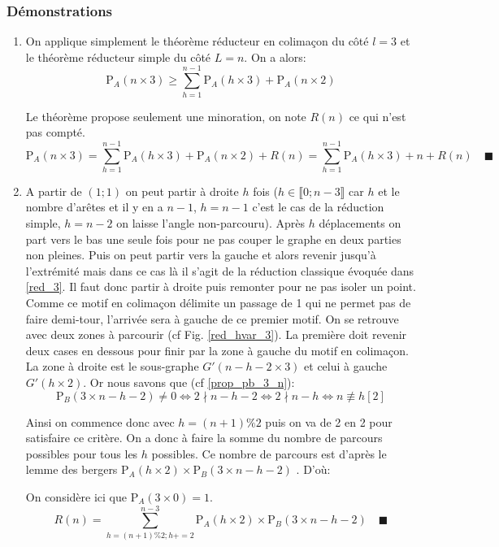 \documentclass[twoside, a4paper, 12pt]{report}
\newcommand{\cqfd}[1][\quad]{\ensuremath{#1\blacksquare}}
\newcommand{\pa}[2]{\ensuremath{\text{P}_A\left(#1 \times #2\right)}}
\newcommand{\pb}[2]{\ensuremath{\text{P}_B\left(#1 \times #2\right)}}
\begin{document}
\subsubsection{Démonstrations}

\begin{enumerate}
\item \label{red_3} On applique simplement le théorème réducteur en colimaçon du côté $l=3$ et le théorème réducteur simple du côté $L=n$. On a alors:
\[\pa{n}{3} \geq \sum_{h=1}^{n-1} \pa{h}{3} + \pa{n}{2}\]

Le théorème propose seulement une minoration, on note $R(n)$ ce qui n'est pas compté.
\[\pa{n}{3} = \sum_{h=1}^{n-1} \pa{h}{3} + \pa{n}{2} + R(n) = \sum_{h=1}^{n-1} \pa{h}{3} + n + R(n)  \cqfd\]

\item A partir de $(1; 1)$ on peut partir à droite $h$ fois ($h \in \llbracket 0; n-3 \rrbracket$ car  $h$ et le nombre d'arêtes et il y en a $n-1$, $h=n-1$ c'est le cas de la réduction simple, $h=n-2$  on laisse l'angle non-parcouru).  Après $h$ déplacements on part vers le bas une seule fois pour ne pas couper le graphe en deux parties non pleines. Puis on peut partir vers la gauche et alors revenir jusqu'à l'extrémité  mais dans ce cas là il s'agit de la réduction classique évoquée dans \ref{red_3}. Il faut donc partir à droite puis remonter pour ne pas isoler un point. Comme ce motif en colimaçon délimite un passage de 1 qui ne permet pas de faire demi-tour, l'arrivée sera à gauche de ce premier motif. On se retrouve avec deux zones à parcourir (cf Fig. \ref{red_hvar_3}). La première doit revenir deux cases en dessous pour finir par la zone à gauche du motif en colimaçon. La zone à droite est le sous-graphe $G'(n-h-2 \times 3)$ et celui à gauche $G'(h \times 2)$. Or nous savons que (cf \ref{prop_pb_3_n}): \[\pb{3}{n-h-2} \not= 0 \Leftrightarrow 2 \nmid n-h-2 \Leftrightarrow 2 \nmid n-h \Leftrightarrow n \not\equiv h [2]\]

Ainsi on commence donc avec $h=(n+1)\%2$ puis on va de 2 en 2 pour satisfaire ce critère. On a donc à faire la somme du nombre de parcours possibles pour tous les $h$ possibles. Ce nombre de parcours est d'après le lemme des bergers $ \pa{h}{2} \times \pb{3}{n-h-2}$ . D'où:

On considère ici que $\pa{3}{0} = 1$.
\[R(n) = \sum_{h=(n+1)\%2; h += 2}^{n-3} \pa{h}{2} \times \pb{3}{n-h-2} \cqfd\]




\end{enumerate}
\end{document}
